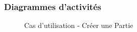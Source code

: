 \documentclass[a4paper,11pt]{article}
\begin{document}
\subsubsection{Diagrammes d'activités}
\begin{figure}[ht!]
\caption{Cas d'utilisation - Créer une Partie}
\end{figure}
\newpage
\end{document}
